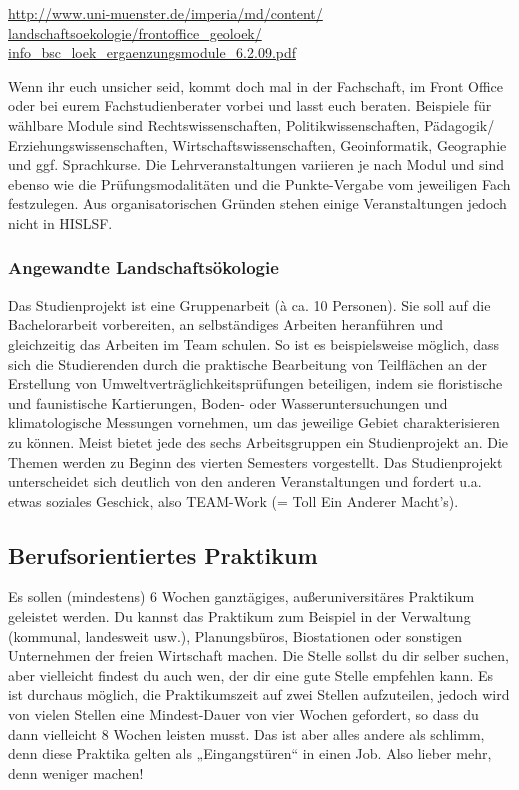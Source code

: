 \url{http://www.uni-muenster.de/imperia/md/content/}\\\url{landschaftsoekologie/frontoffice_geoloek/}\\\url{info_bsc_loek_ergaenzungsmodule_6.2.09.pdf}

Wenn ihr euch unsicher seid, kommt doch mal in der Fachschaft, im Front Office oder bei eurem Fachstudienberater vorbei und lasst euch beraten. Beispiele für wählbare Module sind Rechtswissenschaften, Politikwissenschaften, Pädagogik/ Erziehungswissenschaften, Wirtschaftswissenschaften, Geoinformatik, Geographie und ggf. Sprachkurse. Die Lehrveranstaltungen variieren je nach Modul und sind ebenso wie die Prüfungsmodalitäten und die Punkte-Vergabe vom jeweiligen Fach festzulegen. Aus organisatorischen Gründen stehen einige Veranstaltungen jedoch nicht in HISLSF.

\subsubsection*{Angewandte Landschaftsökologie}
Das Studienprojekt ist eine Gruppenarbeit (à ca. 10 Personen). Sie soll auf die Bachelorarbeit vorbereiten, an selbständiges Arbeiten heranführen und gleichzeitig das Arbeiten im Team schulen. So ist es beispielsweise möglich, dass sich die Studierenden durch die praktische Bearbeitung von Teilﬂächen an der Erstellung von Umweltverträglichkeitsprüfungen beteiligen, indem sie ﬂoristische und faunistische Kartierungen, Boden- oder Wasseruntersuchungen und klimatologische Messungen vornehmen, um das jeweilige Gebiet charakterisieren zu können. Meist bietet jede des sechs Arbeitsgruppen ein Studienprojekt an. Die Themen werden zu Beginn des vierten Semesters vorgestellt. Das Studienprojekt unterscheidet sich deutlich von den anderen Veranstaltungen und fordert u.a. etwas soziales Geschick, also TEAM-Work (= Toll Ein Anderer Macht’s).

\subsection*{Berufsorientiertes Praktikum}
Es sollen (mindestens) 6 Wochen ganztägiges, außeruniversitäres Praktikum geleistet werden. Du kannst das Praktikum zum Beispiel in der Verwaltung (kommunal, landesweit usw.), Planungsbüros, Biostationen oder sonstigen Unternehmen der freien Wirtschaft machen. Die Stelle sollst du dir selber suchen, aber vielleicht ﬁndest du auch wen, der dir eine gute Stelle empfehlen kann. Es ist durchaus möglich, die Praktikumszeit auf zwei Stellen aufzuteilen, jedoch wird von vielen Stellen eine Mindest-Dauer von vier Wochen gefordert, so dass du dann vielleicht 8 Wochen leisten musst. Das ist aber alles andere als schlimm, denn diese Praktika gelten als „Eingangstüren“ in einen Job. Also lieber mehr, denn weniger machen!

